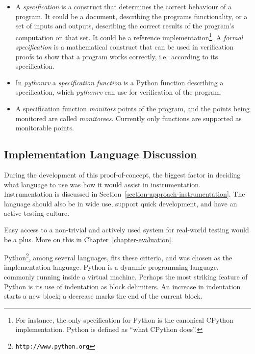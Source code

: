 \documentclass[a4paper,11pt]{kth-mag}
\begin{document}
\begin{itemize}
  \item A \textit{specification} is a construct that determines the correct
    behaviour of a program. It could be a document, describing the programs
		functionality, or a set of inputs and outputs, describing the correct
		results of the program's computation on that set. It could be a reference
		implementation\footnote{For instance, the only specification for Python is
		the canonical CPython implementation. Python is defined as ``what CPython
		does''.}. A \textit{formal specification} is a mathematical construct that
		can be used in verification proofs to show that a program works correctly,
		i.e.\ according to its specification.

	\item In \textit{pythonrv} a \textit{specification function} is a Python
		function describing a specification, which \textit{pythonrv} can use for
		verification of the program.

  \item A specification function \textit{monitors} points of the program, and
    the points being monitored are called \textit{monitorees}. Currently only
    functions are supported as monitorable points.
\end{itemize}


\subsection{Implementation Language Discussion}

During the development of this proof-of-concept, the biggest factor in deciding
what language to use was how it would assist in instrumentation.
Instrumentation is discussed in Section~\ref{section-approach-instrumentation}.
The language should also be in wide use, support quick development, and have an
active testing culture.

Easy access to a non-trivial and actively used system for real-world testing
would be a plus. More on this in Chapter~\ref{chapter-evaluation}.

Python\footnote{\texttt{http://www.python.org}}, among several languages, fits
these criteria, and was chosen as the implementation language. Python is a
dynamic programming language, commonly running inside a virtual machine.
Perhaps the most striking feature of Python is its use of indentation as block
delimiters. An increase in indentation starts a new block; a decrease marks the
end of the current block.
\end{document}
